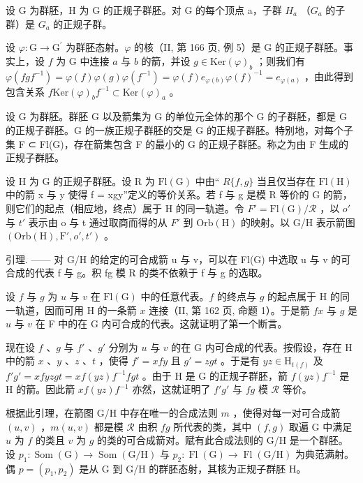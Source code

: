 设 G 为群胚，H 为 G 的正规子群胚。对 G 的每个顶点 a，子群 \(H_{a}\) （\(G_{a}\) 的子群）是 \(G_{a}\) 的正规子群。

设 \(\varphi\colon\mathrm{G}\to\mathrm{G}^{\prime}\) 为群胚态射。\(\varphi\) 的核（II, 第 166 页, 例 5）是 G 的正规子群胚。事实上，设 \(f\) 为 G 中连接 \(a\) 与 \(b\) 的箭，并设 \(g\in\mathrm{Ker}(\varphi)_{b}\) ；则我们有 \(\varphi(fgf^{-1})=\varphi(f)\varphi(g)\varphi(f^{-1})=\varphi(f)e_{\varphi(b)}\varphi(f)^{-1}=e_{\varphi(a)}\) ，由此得到包含关系 \(f\mathrm{Ker}(\varphi)_{b}f^{-1}\subset\mathrm{Ker}(\varphi)_{a}\) 。

设 G 为群胚。群胚 G 以及箭集为 G 的单位元全体的那个 G 的子群胚，都是 G 的正规子群胚。G 的一族正规子群胚的交是 G 的正规子群胚。特别地，对每个子集 F ⊂ Fl(G)，存在箭集包含 F 的最小的 G 的正规子群胚。称之为由 F 生成的正规子群胚。

设 H 为 G 的正规子群胚。设 R 为 \(\mathrm{Fl}(\mathrm{G})\) 中由“ \(R\{f,g\}\) 当且仅当存在 \(\mathrm{Fl}(\mathrm{H})\) 中的箭 x 与 y 使得 f = xgy”定义的等价关系。若 f 与 g 是模 R 等价的 G 的箭，则它们的起点（相应地，终点）属于 H 的同一轨道。令 \(F' = \mathrm{Fl}(\mathrm{G}) / \mathcal{R}\) ，以 \(o'\) 与 \(t'\) 表示由 o 与 t 通过取商而得的从 \(F'\) 到 \(\mathrm{Orb}(\mathrm{H})\) 的映射。以 G/H 表示箭图 \((\mathrm{Orb}(\mathrm{H}), \mathrm{F}', o', t')\) 。

引理. —— 对 G/H 的给定的可合成箭 u 与 v，可以在 Fl(G) 中选取 u 与 v 的可合成的代表 f 与 g。积 fg 模 R 的类不依赖于 f 与 g 的选取。

设 \(f\) 与 \(g\) 为 \(u\) 与 \(v\) 在 \(\mathrm{Fl(G)}\) 中的任意代表。\(f\) 的终点与 \(g\) 的起点属于 H 的同一轨道，因而可用 H 的一条箭 \(x\) 连接（II, 第 162 页, 命题 1）。于是箭 \(fx\) 与 \(g\) 是 \(u\) 与 \(v\) 在 F 中的在 G 内可合成的代表。这就证明了第一个断言。

现在设 \(f\) 、\(g\) 与 \(f'\) 、\(g'\) 分别为 \(u\) 与 \(v\) 的在 G 内可合成的代表。按假设，存在 H 中的箭 \(x\) 、\(y\) 、\(z\) 、\(t\) ，使得 \(f' = xfy\) 且 \(g' = zgt\) 。于是有 \(yz \in \mathrm{H}_{t(f)}\) 及 \(f'g' = x f y z g t = x f(yz)f^{-1}f g t\) 。由于 H 是 G 的正规子群胚，箭 \(f(yz)f^{-1}\) 是 H 的箭。因此箭 \(x f(yz)f^{-1}\) 亦然，这就证明了 \(f'g'\) 与 \(fg\) 模 \(\mathcal{R}\) 等价。

根据此引理，在箭图 G/H 中存在唯一的合成法则 \(m\) ，使得对每一对可合成箭 \((u,v)\) ，\(m(u,v)\) 都是模 \(\mathcal{R}\) 由积 \(fg\) 所代表的类，其中 \((f,g)\) 取遍 G 中满足 \(u\) 为 \(f\) 的类且 \(v\) 为 \(g\) 的类的可合成箭对。赋有此合成法则的 G/H 是一个群胚。设 \(p_1\colon \operatorname{Som}(\mathrm{G}) \to \operatorname{Som}(\mathrm{G}/\mathrm{H})\) 与 \(p_2\colon \operatorname{Fl}(\mathrm{G}) \to \operatorname{Fl}(\mathrm{G}/\mathrm{H})\) 为典范满射。偶 \(p = (p_1,p_2)\) 是从 G 到 G/H 的群胚态射，其核为正规子群胚 H。

